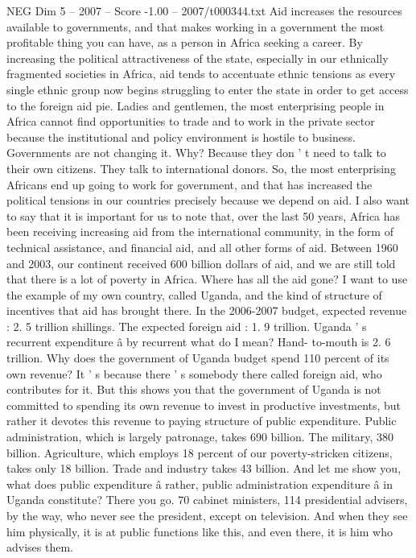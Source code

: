 \begin{textsample}{NEG Dim 5 – 2007 – Score -1.00 – 2007/t000344.txt}
Aid increases the resources available to governments, and that makes working in a government the most profitable thing you can have, as a person in Africa seeking a career.
By increasing the political attractiveness of the state, especially in our ethnically fragmented societies in Africa, aid tends to accentuate ethnic tensions as every single ethnic group now begins struggling to enter the state in order to get access to the foreign aid pie.
Ladies and gentlemen, the most enterprising people in Africa cannot find opportunities to trade and to work in the private sector because the institutional and policy environment is hostile to business.
Governments are not changing it.
Why?
Because they don ' t need to talk to their own citizens.
They talk to international donors.
So, the most enterprising Africans end up going to work for government, and that has increased the political tensions in our countries precisely because we depend on aid.
I also want to say that it is important for us to note that, over the last 50 years, Africa has been receiving increasing aid from the international community, in the form of technical assistance, and financial aid, and all other forms of aid.
Between 1960 and 2003, our continent received 600 billion dollars of aid, and we are still told that there is a lot of poverty in Africa.
Where has all the aid gone?
I want to use the example of my own country, called Uganda, and the kind of structure of incentives that aid has brought there.
In the 2006-2007 budget, expected revenue : 2. 5 trillion shillings.
The expected foreign aid : 1. 9 trillion.
Uganda ' s recurrent expenditure â by recurrent what do I mean?
Hand- to-mouth is 2. 6 trillion.
Why does the government of Uganda budget spend 110 percent of its own revenue?
It ' s because there ' s somebody there called foreign aid, who contributes for it.
But this shows you that the government of Uganda is not committed to spending its own revenue to invest in productive investments, but rather it devotes this revenue to paying structure of public expenditure.
Public administration, which is largely patronage, takes 690 billion.
The military, 380 billion.
Agriculture, which employs 18 percent of our poverty-stricken citizens, takes only 18 billion.
Trade and industry takes 43 billion.
And let me show you, what does public expenditure â rather, public administration expenditure â in Uganda constitute?
There you go. 70 cabinet ministers, 114 presidential advisers, by the way, who never see the president, except on television.
And when they see him physically, it is at public functions like this, and even there, it is him who advises them.

\end{textsample}
